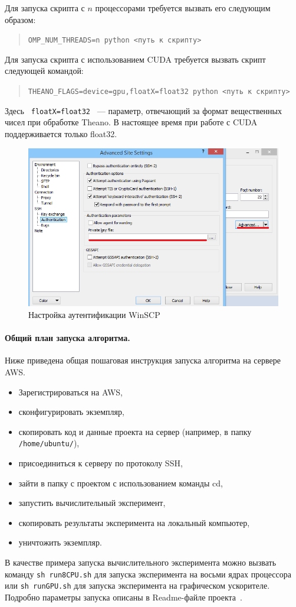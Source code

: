 \documentclass[12pt]{article}
\begin{document}
Для запуска скрипта с $n$ процессорами требуется вызвать его следующим образом:
\begin{quote}
\texttt{OMP\_NUM\_THREADS=n python <путь к скрипту>}
\end{quote}

Для запуска скрипта с использованием CUDA требуется вызвать скрипт следующей командой:
\begin{quote}
\texttt{THEANO\_FLAGS=device=gpu,floatX=float32 python <путь к скрипту> }
\end{quote}
Здесь \texttt{ floatX=float32 } --- параметр, отвечающий за формат вещественных чисел при обработке Theano. В настоящее время при работе с CUDA поддерживается только float32.

\begin{figure}[!ht]
 \centering
  \includegraphics[width=\textwidth]{scp.png}
 \caption{Настройка аутентификации WinSCP}
 \label{fig:scp}
\end{figure}

\paragraph{Общий план запуска алгоритма.}
Ниже приведена общая пошаговая инструкция запуска алгоритма на сервере AWS.

\begin{itemize}
\item Зарегистрироваться на AWS,
\item сконфигурировать экземпляр,
\item скопировать код и данные проекта на сервер (например, в папку \texttt{/home/ubuntu/}),
\item присоединиться к серверу по протоколу SSH,
\item зайти в папку с проектом с использованием команды cd,
\item запустить вычислительный эксперимент,
\item скопировать результаты эксперимента на локальный компьютер,
\item уничтожить экземпляр.
\end{itemize}
В качестве примера запуска вычислительного эксперимента можно вызвать команду
\texttt{sh run8CPU.sh}
для запуска эксперимента на восьми ядрах процессора или
\texttt{sh runGPU.sh}
для запуска эксперимента на графическом ускорителе. Подробно параметры запуска описаны в Readme-файле проекта~\cite{svn}.
\end{document}
